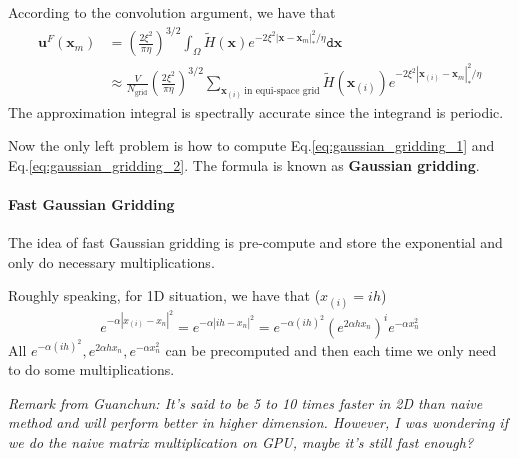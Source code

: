 \documentclass{article}[12pt]
\begin{document}
According to the convolution argument, we have that
\begin{align}
\mathbf{u}^F (\mathbf{x}_m) & =  \left(\frac{2 \xi^2}{\pi \eta}\right)^{3/2}  \int_{\Omega} \tilde{H}(\mathbf{x}) e^{-2 \xi^2 |\mathbf{x} - \mathbf{x}_m|_{\ast}^2 / \eta} \mathtt{d} \mathbf{x} \\
& \approx \frac{V}{N_{\text{grid}}} \left(\frac{2 \xi^2}{\pi \eta}\right)^{3/2} \sum_{\mathbf{x}_{(i)} \ \text{in equi-space grid}} \tilde{H}(\mathbf{x}_{(i)}) e^{-2 \xi^2 |\mathbf{x}_{(i)} - \mathbf{x}_m|_{\ast}^2 / \eta} \label{eq:gaussian_gridding_2}
\end{align}
The approximation integral is spectrally accurate since the integrand is periodic.

Now the only left problem is how to compute Eq.\eqref{eq:gaussian_gridding_1} and Eq.\eqref{eq:gaussian_gridding_2}. The formula is known as \textbf{Gaussian gridding}.

\paragraph{Fast Gaussian Gridding} The idea of fast Gaussian gridding is pre-compute and store the exponential and only do necessary multiplications.

Roughly speaking, for 1D situation, we have that ($x_{(i)} = ih$)
\begin{equation}
e^{-\alpha|x_{(i)} - x_n|^2} = e^{-\alpha|ih - x_n|^2} = e^{-\alpha (ih)^2} \left(e^{2 \alpha h x_n}\right)^i e^{-\alpha x_n^2}
\end{equation}
All $e^{-\alpha (ih)^2}, e^{2 \alpha h x_n}, e^{-\alpha x_n^2}$ can be precomputed and then each time we only need to do some multiplications. 

\textit{Remark from Guanchun: It's said to be 5 to 10 times faster in 2D than naive method and will perform better in higher dimension. However, I was wondering if we do the naive matrix multiplication on GPU, maybe it's still fast enough?}
\end{document}
